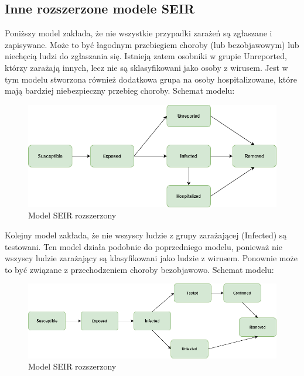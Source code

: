 \documentclass[12pt,a4paper]{article}
\begin{document}
\subsection{Inne rozszerzone modele SEIR}
Poniższy model zakłada, że nie wszystkie przypadki zarażeń są zgłaszane i zapisywane. Może to być łagodnym przebiegiem choroby (lub bezobjawowym) lub niechęcią ludzi do zgłaszania się. Istnieją  zatem osobniki w grupie Unreported, którzy zarażają innych, lecz nie są sklasyfikowani jako osoby z wirusem. Jest w tym modelu stworzona również dodatkowa grupa na osoby hospitalizowane, które mają bardziej niebezpieczny przebieg choroby.  
Schemat modelu:
\begin{figure}[h!]
\centering
\includegraphics[width=1.0\textwidth]{Schematy/SEIR_ext_1}
\caption{Model SEIR rozszerzony} 
\label{fig:Model SEIR rozszerzony1}
\end{figure}


Kolejny model zakłada, że nie wszyscy ludzie z grupy zarażającej (Infected) są testowani. Ten model działa podobnie do poprzedniego modelu, ponieważ nie wszyscy ludzie zarażający są klasyfikowani jako ludzie z wirusem. Ponownie może to być związane z przechodzeniem choroby bezobjawowo. 
Schemat modelu:
\begin{figure}[h!]
\centering
\includegraphics[width=1.0\textwidth]{Schematy/SEIR_ext_2}
\caption{Model SEIR rozszerzony} 
\label{fig:Model SEIR rozszerzony2}
\end{figure}
\end{document}
